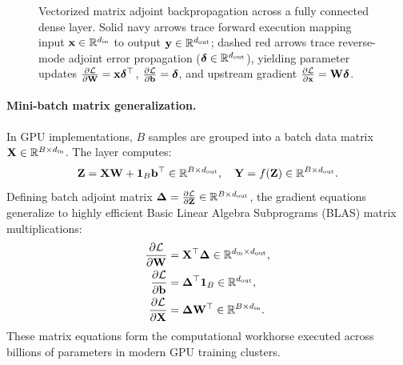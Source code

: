 \documentclass[../../main.tex]{subfiles}
\begin{document}
\begin{figure}[htbp]
\caption{Vectorized matrix adjoint backpropagation across a fully connected dense layer. Solid navy arrows trace forward execution mapping input $\mathbf{x} \in \mathbb{R}^{d_{\text{in}}}$ to output $\mathbf{y} \in \mathbb{R}^{d_{\text{out}}}$; dashed red arrows trace reverse-mode adjoint error propagation ($\bm{\delta} \in \mathbb{R}^{d_{\text{out}}}$), yielding parameter updates $\frac{\partial \mathcal{L}}{\partial \mathbf{W}} = \mathbf{x} \bm{\delta}^\top$, $\frac{\partial \mathcal{L}}{\partial \mathbf{b}} = \bm{\delta}$, and upstream gradient $\frac{\partial \mathcal{L}}{\partial \mathbf{x}} = \mathbf{W} \bm{\delta}$.}
\label{fig:vectorized_backprop_block}
\end{figure}

\paragraph{Mini-batch matrix generalization.}
In GPU implementations, $B$ samples are grouped into a batch data matrix $\mathbf{X} \in \mathbb{R}^{B \times d_{\text{in}}}$. The layer computes:
\begin{equation}
\mathbf{Z} = \mathbf{X} \mathbf{W} + \mathbf{1}_B \mathbf{b}^\top \in \mathbb{R}^{B \times d_{\text{out}}}, \quad \mathbf{Y} = f(\mathbf{Z}) \in \mathbb{R}^{B \times d_{\text{out}}}.
\end{equation}
Defining batch adjoint matrix $\bm{\Delta} = \frac{\partial \mathcal{L}}{\partial \mathbf{Z}} \in \mathbb{R}^{B \times d_{\text{out}}}$, the gradient equations generalize to highly efficient Basic Linear Algebra Subprograms (BLAS) matrix multiplications:
\begin{align}
\frac{\partial \mathcal{L}}{\partial \mathbf{W}} &= \mathbf{X}^\top \bm{\Delta} \in \mathbb{R}^{d_{\text{in}} \times d_{\text{out}}}, \label{eq:batch_grad_W} \\
\frac{\partial \mathcal{L}}{\partial \mathbf{b}} &= \bm{\Delta}^\top \mathbf{1}_B \in \mathbb{R}^{d_{\text{out}}}, \label{eq:batch_grad_b} \\
\frac{\partial \mathcal{L}}{\partial \mathbf{X}} &= \bm{\Delta} \mathbf{W}^\top \in \mathbb{R}^{B \times d_{\text{in}}}. \label{eq:batch_grad_X}
\end{align}
These matrix equations form the computational workhorse executed across billions of parameters in modern GPU training clusters.
\end{document}
